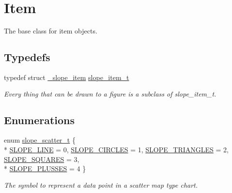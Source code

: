 \hypertarget{group__Item}{\section{Item}
\label{group__Item}
}


The base class for item objects.  


\subsection*{Typedefs}
\begin{DoxyCompactItemize}
\item 
\hypertarget{group__Item_ga2616141f0e164a876049da51ea3a8646}{typedef struct \hyperlink{struct__slope__item}{\+\_\+slope\+\_\+item} \hyperlink{group__Item_ga2616141f0e164a876049da51ea3a8646}{slope\+\_\+item\+\_\+t}}\label{group__Item_ga2616141f0e164a876049da51ea3a8646}

\begin{DoxyCompactList}\small\item\em Every thing that can be drawn to a figure is a subclass of slope\+\_\+item\+\_\+t. \end{DoxyCompactList}\end{DoxyCompactItemize}
\subsection*{Enumerations}
\begin{DoxyCompactItemize}
\item 
enum \hyperlink{group__Item_ga7be66725a3a198bcbd9434e6d3ad70c5}{slope\+\_\+scatter\+\_\+t} \{ \\*
\hyperlink{group__Item_gga7be66725a3a198bcbd9434e6d3ad70c5a54cf36614caf64fac788937a888664d7}{S\+L\+O\+P\+E\+\_\+\+L\+I\+N\+E} = 0, 
\hyperlink{group__Item_gga7be66725a3a198bcbd9434e6d3ad70c5ad80e96cfe8b1fc4e166a9dd2916949a9}{S\+L\+O\+P\+E\+\_\+\+C\+I\+R\+C\+L\+E\+S} = 1, 
\hyperlink{group__Item_gga7be66725a3a198bcbd9434e6d3ad70c5a49e3d5b6cb489463f001bdf14d484315}{S\+L\+O\+P\+E\+\_\+\+T\+R\+I\+A\+N\+G\+L\+E\+S} = 2, 
\hyperlink{group__Item_gga7be66725a3a198bcbd9434e6d3ad70c5a5f482758196621c2a65e206ef287f030}{S\+L\+O\+P\+E\+\_\+\+S\+Q\+U\+A\+R\+E\+S} = 3, 
\\*
\hyperlink{group__Item_gga7be66725a3a198bcbd9434e6d3ad70c5a9eb209c97e09aa4121f056641c60e56c}{S\+L\+O\+P\+E\+\_\+\+P\+L\+U\+S\+S\+E\+S} = 4
 \}
\begin{DoxyCompactList}\small\item\em The symbol to represent a data point in a scatter map type chart. \end{DoxyCompactList}\end{DoxyCompactItemize}
